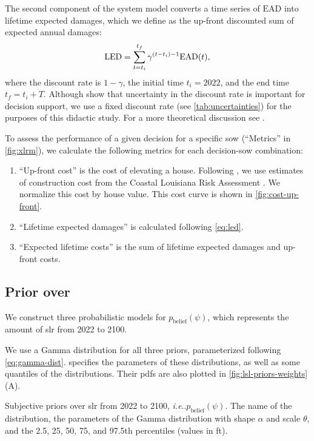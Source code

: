\documentclass[11pt]{article}
\makeatletter
\DeclareRobustCommand\onedot{\futurelet\@let@token\@onedot}
\def\@onedot{\ifx\@let@token.\else.\null\fi\xspace}
\def\ie{\emph{i.e}\onedot} \def\Ie{\emph{I.e}\onedot}
\DeclareRobustCommand\onedot{\futurelet\@let@token\@onedot}
\def\@onedot{\ifx\@let@token.\else.\null\fi\xspace}
\def\ie{\emph{i.e}\onedot} \def\Ie{\emph{I.e}\onedot}
\makeatother
\begin{document}
The second component of the system model converts a time series of $\mathrm{EAD}$ into lifetime expected damages, which we define as the up-front  discounted sum of expected annual damages:
\begin{equation}\label{eq:led}
    \textrm{LED} = \sum_{t=t_i}^{t_f} \gamma^{\qty(t-t_i)-1} \textrm{EAD}(t),
\end{equation}
where the discount rate is $1 - \gamma$, the initial time $t_i=2022$, and the end time $t_f = t_i + T$.
Although \citet{zarekarizi_suboptimal:2020} show that uncertainty in the discount rate is important for decision support, we use a fixed discount rate (see \cref{tab:uncertainties}) for the purposes of this didactic study.
For a more theoretical discussion see \citet{arrow_discount:2013}.

To assess the performance of a given decision for a specific \gls{sow} (``Metrics'' in \cref{fig:xlrm}), we calculate the following metrics for each decision-\gls{sow} combination:
\begin{enumerate}
    \item ``Up-front cost'' is the cost of elevating a house. Following \citet{zarekarizi_suboptimal:2020}, we use estimates of construction cost from the Coastal Louisiana Risk Assessment \citep{fischbach_clara:2012}. We normalize this cost by house value. This cost curve is shown in \cref{fig:cost-up-front}.
    \item ``Lifetime expected damages'' is calculated following \cref{eq:led}.
    \item ``Expected lifetime costs'' is the sum of lifetime expected damages and up-front costs.
\end{enumerate}

\subsection{Prior over }\label{sec:case-priors}

We construct three probabilistic models for $p_\mathrm{belief}(\psi)$, which represents the amount of \gls{slr} from 2022 to 2100.

We use a Gamma distribution for all three priors, parameterized following \cref{eq:gamma-dist}.
 specifies the parameters of these distributions, as well as some quantiles of the distributions.
Their \glspl{pdf} are also plotted in \cref{fig:lsl-priors-weights}(A).

\begin{table}[h]
    \centering
    \caption{
        Subjective priors over \gls{slr} from 2022 to 2100, \ie $p_\mathrm{belief}(\psi)$.
        The name of the distribution, the parameters of the Gamma distribution with shape $\alpha$ and scale $\theta$, and the 2.5, 25, 50, 75, and 97.5th percentiles (values in \si{ft}).
    }\label{tab:slr-priors}
    
\end{table}
\end{document}
